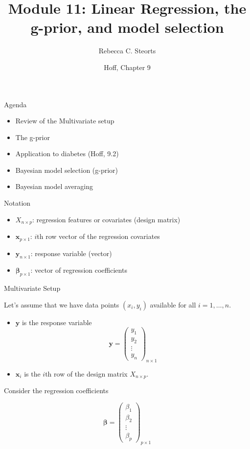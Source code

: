 \documentclass[ignorenonframetext,]{beamer}
\title{Module 11: Linear Regression, the g-prior, and model selection}
\author{Rebecca C. Steorts}
\date{Hoff, Chapter 9}
\providecommand{\tightlist}{%
  \setlength{\itemsep}{0pt}\setlength{\parskip}{0pt}}
\newcommand{\bbeta}{\bm{\beta}}
\newcommand{\by}   {\bm{y}}
\newcommand{\bx}{\ensuremath{\mathbf{x}}}
\begin{document}
\frame{\titlepage}

\begin{frame}{Agenda}

\begin{itemize}
\tightlist
\item
  Review of the Multivariate setup
\item
  The g-prior
\item
  Application to diabetes (Hoff, 9.2)
\item
  Bayesian model selection (g-prior)
\item
  Bayesian model averaging
\end{itemize}

\end{frame}

\begin{frame}{Notation}

\begin{itemize}
\tightlist
\item
  \(X_{n\times p}\): regression features or covariates (design matrix)
\item
  \(\bx_{p \times 1}\): \(i\)th row vector of the regression covariates
\item
  \(\by_{n\times 1}\): response variable (vector)
\item
  \(\bbeta_{p \times 1}\): vector of regression coefficients
\end{itemize}

\end{frame}

\begin{frame}{Multivariate Setup}

Let's assume that we have data points \((x_i,y_i)\) available for all
\(i=1,\ldots,n.\)

\begin{itemize}
\tightlist
\item
  \(\by\) is the response variable \[  \by= \left( \begin{array}{c}
  y_1\\
  y_2\\
  \vdots\\
  y_n
  \end{array} \right)_{n \times 1} \]
\item
  \(\bx_{i}\) is the \(i\)th row of the design matrix
  \(X_{n \times p}.\)
\end{itemize}

Consider the regression coefficients

\[  \bbeta = \left( \begin{array}{c}
\beta_{1}\\
\beta_{2}\\
\vdots\\
\beta_{p}
\end{array} \right)_{p \times 1} \]

\end{frame}
\end{document}

